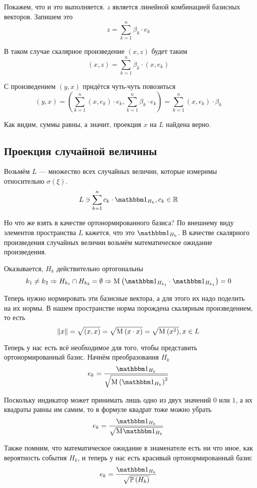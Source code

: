 Покажем, что и это выполняется.
$z$ является линейной комбинацией базисных векторов. Запишем это
$$z = \sum_{k=1}^n \beta_k\cdot e_k$$

В таком случае скалярное произведение $\left( x,z \right)$ будет таким
$$\left( x,z \right)=\sum_{k=1}^n \beta_k\cdot \left( x,e_k \right)$$

С произведением $\left( y,x \right)$ придётся чуть-чуть повозиться
$$\left( y,x \right)
    =\left( \sum_{k=1}^n\left( x,e_k \right)\cdot e_k,
        \sum_{k=1}^n \beta_k\cdot e_k \right)
    =\sum_{k=1}^n \left( x,e_k \right)\cdot\beta_k$$

Как видим, суммы равны, а значит, проекция $x$ на $L$ найдена верно.

\subsection{Проекция случайной величины}
Возьмём $L$ --- множество всех случайных величин, которые
измеримы относительно $\sigma\left( \xi \right)$.
$$L \ni \sum_{k=1}^n c_k \cdot \indicatorof{H_k}, c_k \in \mathbb{R}$$

Но что же взять в качестве ортонормированного базиса?
По внешнему виду элементов пространства $L$ кажется,
что это $\indicatorof{H_k}$.
В качестве скалярного произведения случайных величин
возьмём математическое ожидание произведения.

Оказывается, $H_k$ действительно ортогональны
$$k_1 \neq k_2
    \Rightarrow H_{k_1} \cap H_{k_2} = \emptyset
    \Rightarrow
    \mean{\left( \indicatorof{H_{k_1}}\cdot \indicatorof{H_{k_1}} \right)} = 0$$

Теперь нужно нормировать эти базисные вектора,
а для этого их надо поделить на их нормы.
В нашем пространстве норма порождена скалярным произведением,
то есть
$$\left\| x \right\| = \sqrt{\left( x,x \right)}
    = \sqrt{\mathrm{M}_{} \left( x \cdot x \right)}
    = \sqrt{\mathrm{M}_{} \left( x^2 \right)}, x \in L$$

Теперь у нас есть всё необходимое для того,
чтобы представить ортонормированный базис.
Начнём преобразования $H_k$
$$e_k = \frac{\indicatorof{H_k}}
    {\sqrt{\mean{\left( \indicatorof{H_k} \right)^2}}}$$

Поскольку индикатор может принимать лишь одно из двух значений $0$ или $1$,
а их квадраты равны им самим, то в формуле квадрат тоже можно убрать
$$e_k = \frac{\indicatorof{H_k}}{\sqrt{\mean{\indicatorof{H_k}}}}$$

Также помним, что математическое ожидание в знаменателе есть ни что иное,
как вероятность события $H_k$,
и теперь у нас есть красивый ортонормированный базис
\begin{equation}\label{orthonormalBasis}
e_k = \frac{\indicatorof{H_k}}{\sqrt{\probability{H_k}}}
\end{equation}

